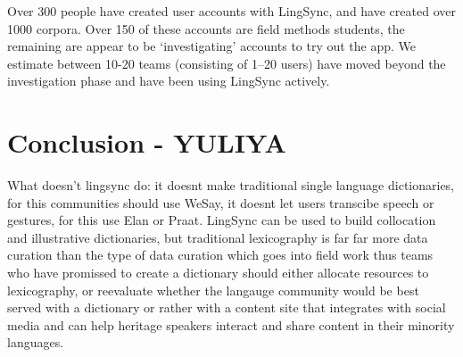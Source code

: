 \documentclass[letterpaper, 12pt, dvips]{mitwpl}
\begin{document}
Over 300 people have created user accounts with LingSync,
and have created over 1000 corpora.
Over 150 of these accounts are field methods students, the remaining are appear to be `investigating' accounts to try out the app.
We estimate between 10-20 teams (consisting of 1--20 users) have moved beyond the investigation phase and have been using LingSync actively.

\section{Conclusion - YULIYA} 

What doesn't lingsync do: it doesnt make traditional single language dictionaries, for this communities should use WeSay, it doesnt let users transcibe speech or gestures, for this use Elan or Praat. LingSync can be used to build collocation and illustrative dictionaries, but traditional lexicography is far far more data curation than the type of data curation which goes into field work thus teams who have promissed to create a dictionary should either allocate resources to lexicography, or reevaluate whether the langauge community would be best served with a dictionary or rather with a content site that integrates with social media and can help heritage speakers interact and share content in their minority languages. 


\custombib{}
\end{document}
